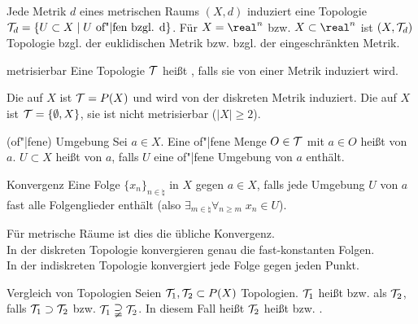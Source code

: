 \begin{Bsp}
    Jede Metrik $d$ eines metrischen Raums $(X, d)$ induziert eine Topologie \\
    $\mathcal{T}_d = \{U \subset X \;|\; U \text{ of"|fen bzgl. d}\}$.
    Für $X = \real^n$ bzw. $X \subset \real^n$ ist $(X, \mathcal{T}_d)$
    Topologie bzgl. der euklidischen Metrik bzw. bzgl. der eingeschränkten
    Metrik.
\end{Bsp}

\begin{Def}{metrisierbar}
    Eine Topologie $\mathcal{T}$ heißt , falls
    sie von einer Metrik induziert wird.
\end{Def}

\begin{Bsp}
    Die  auf $X$ ist $\mathcal{T} = P(X)$ und wird
    von der diskreten Metrik induziert.
    Die  auf $X$ ist $\mathcal{T} = \{\emptyset, X\}$,
    sie ist nicht metrisierbar ($|X| \ge 2$).
\end{Bsp}

\linie

\begin{Def}{(of"|fene) Umgebung}
    Sei $a \in X$.
    Eine of"|fene Menge $O \in \mathcal{T}$ mit $a \in O$ heißt
     von $a$.
    $U \subset X$ heißt  von $a$, falls $U$ eine of"|fene
    Umgebung von $a$ enthält.
\end{Def}

\begin{Def}{Konvergenz}
    Eine Folge $\{x_n\}_{n \in \natural}$ in $X$  gegen
    $a \in X$, falls jede Umgebung $U$ von $a$ fast alle Folgenglieder enthält
    (also $\exists_{m \in \natural} \forall_{n \ge m}\; x_n \in U$).
\end{Def}

\begin{Bsp}
    Für metrische Räume ist dies die übliche Konvergenz. \\
    In der diskreten Topologie konvergieren genau die
    fast-konstanten Folgen. \\
    In der indiskreten Topologie konvergiert jede Folge gegen jeden Punkt.
\end{Bsp}

\linie

\begin{Def}{Vergleich von Topologien}
    Seien $\mathcal{T}_1, \mathcal{T}_2 \subset P(X)$ Topologien.
    $\mathcal{T}_1$ heißt  bzw.  als
    $\mathcal{T}_2$, falls $\mathcal{T}_1 \supset \mathcal{T}_2$ bzw.
    $\mathcal{T}_1 \supsetneqq \mathcal{T}_2$.
    In diesem Fall heißt $\mathcal{T}_2$ heißt  bzw.
    .
\end{Def}

